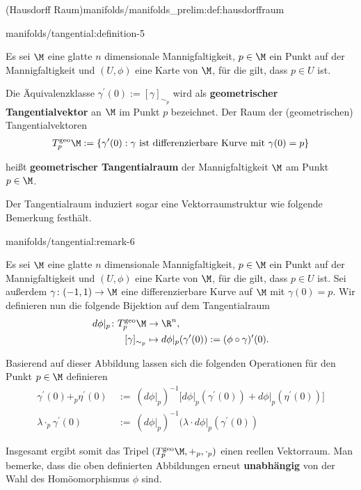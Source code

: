 \documentclass[letterpaper,10pt,english]{jupyterBook}
\begin{document}
\begin{definition}{(Hausdorff Raum)}{manifolds/manifolds_prelim:def:hausdorffraum}
\begin{definition}{}{manifolds/tangential:definition-5}
\par
Es sei \(\M\) eine glatte \(n\) dimensionale Mannigfaltigkeit, \(p\in\M\) ein Punkt auf der Mannigfaltigkeit und \((U,\phi)\) eine Karte von \(\M\), für die gilt, dass \(p\in U\) ist.

\par
Die Äquivalenzklasse \(\gamma^\prime(0):=[\gamma]_{\sim_p}\) wird als \textbf{geometrischer Tangentialvektor} an \(\M\) im Punkt \(p\) bezeichnet.
Der Raum der (geometrischen) Tangentialvektoren
\begin{align*}
T_p^{\text{geo}}\M := \{\gamma^\prime(0): \gamma\text{ ist differenzierbare Kurve mit }\gamma(0)=p\}
\end{align*}
\par
heißt \textbf{geometrischer Tangentialraum} der Mannigfaltigkeit \(\M\) am Punkt \(p \in \M\).
\end{definition}

\par
Der Tangentialraum induziert sogar eine Vektorraumstruktur wie folgende Bemerkung festhält.
\begin{remark}{}{manifolds/tangential:remark-6}



\par
Es sei \(\M\) eine glatte \(n\) dimensionale Mannigfaltigkeit, \(p\in\M\) ein Punkt auf der Mannigfaltigkeit und \((U,\phi)\) eine Karte von \(\M\), für die gilt, dass \(p\in U\) ist.
Sei außerdem \(\gamma \colon (-1,1) \rightarrow \M\) eine differenzierbare Kurve auf \(\M\) mit \(\gamma(0) = p\).
Wir definieren nun die folgende Bijektion auf dem Tangentialraum
\begin{align*}
d\phi\rvert_p \colon T^{\text{geo}}_p\M &\rightarrow \R^n,\\
[\gamma]_{\sim_p} &\mapsto d\phi\rvert_p (\gamma^\prime(0)) := (\phi \circ \gamma)^\prime (0).
\end{align*}
\par
Basierend auf dieser Abbildung lassen sich die folgenden Operationen für den Punkt \(p \in \M\) definieren
\begin{align*}
\gamma^\prime(0) +_{p} \eta^\prime(0) \ &:= \
(d\phi\rvert_p)^{-1}\big[d\phi\rvert_p(\gamma^\prime(0)) + d\phi\rvert_p(\eta^\prime(0))\big]\\
\lambda \cdot_p \gamma^\prime(0) \ &:= \ (d\phi\rvert_p)^{-1} (\lambda \cdot d\phi\rvert_p(\gamma^\prime(0))
\end{align*}
\par
Insgesamt ergibt somit das Tripel \((T_p^{\text{geo}}\M, +_p, \cdot_p)\) einen reellen Vektorraum.
Man bemerke, dass die oben definierten Abbildungen erneut \textbf{unabhängig} von der Wahl des Homöomorphismus \(\phi\) sind.
\end{remark}



\end{definition}
\end{document}

